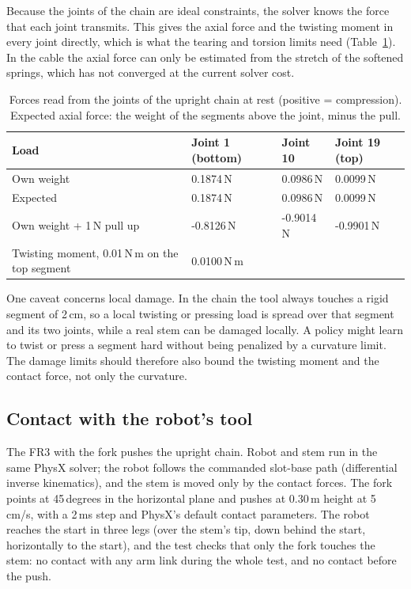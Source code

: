 Because the joints of the chain are ideal constraints, the solver knows the force that each joint transmits. This
gives the axial force and the twisting moment in every joint directly, which is what the tearing and torsion
limits need (Table~\ref{tab:chain-forces}). In the cable the axial force can only be estimated from the
stretch of the softened springs, which has not converged at the current solver cost.

\begin{table}[h]
  \centering
  \caption{Forces read from the joints of the upright chain at rest (positive = compression). Expected axial
           force: the weight of the segments above the joint, minus the pull.}
  \label{tab:chain-forces}
  \begin{tabular}{llll}
    \toprule
    Load & Joint 1 (bottom) & Joint 10 & Joint 19 (top) \\
    \midrule
    Own weight                  & 0.1874\,N  & 0.0986\,N  & 0.0099\,N \\
    Expected                    & 0.1874\,N  & 0.0986\,N  & 0.0099\,N \\
    Own weight + 1\,N pull up   & -0.8126\,N & -0.9014\,N & -0.9901\,N \\
    \midrule
    Twisting moment, 0.01\,N\,m on the top segment & 0.0100\,N\,m & & \\
    \bottomrule
  \end{tabular}
\end{table}

One caveat concerns local damage. In the chain the tool always touches a rigid segment of 2\,cm, so a local
twisting or pressing load is spread over that segment and its two joints, while a real stem can be damaged
locally. A policy might learn to twist or press a segment hard without being penalized by a curvature limit.
The damage limits should therefore also bound the twisting moment and the contact force, not only the
curvature.

\subsection{Contact with the robot's tool}
\label{sec:contact}

The FR3 with the fork pushes the upright chain. Robot and stem run in the same PhysX solver; the robot follows
the commanded slot-base path (differential inverse kinematics), and the stem is moved only by the contact forces.
The fork points at 45\,degrees in the horizontal plane and pushes at 0.30\,m height at 5\,cm/s, with a 2\,ms
step and PhysX's default contact parameters. The robot reaches the start in three legs (over the stem's tip,
down behind the start, horizontally to the start), and the test checks that only the fork touches the stem:
no contact with any arm link during the whole test, and no contact before the push.


